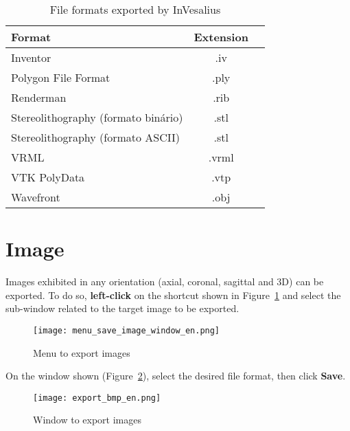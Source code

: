 \begin{table}[h]
\centering
\caption{File formats exported by InVesalius}
\begin{tabular}{lcc}\\
\hline %
Format & Extension\\
\hline
\hline
Inventor & .iv\\
Polygon File Format & .ply\\
Renderman & .rib\\
Stereolithography (formato binário)& .stl\\
Stereolithography (formato ASCII) & .stl\\
VRML & .vrml\\
VTK PolyData & .vtp\\
Wavefront & .obj\\
\hline
\end{tabular}
\label{tab:files_export_list}
\end{table} 


\section{Image}

Images exhibited in any orientation (axial, coronal, sagittal and 3D) can be exported. To do so, \textbf{left-click} on the shortcut shown in Figure~\ref{fig:menu_save_image_window} and select the sub-window related to the target image to be exported.

\begin{figure}[!htb]
\centering
\texttt{[image: menu\_save\_image\_window\_en.png]}
\caption{Menu to export images}
\label{fig:menu_save_image_window}
\end{figure}

On the window shown (Figure~\ref{fig:save_image_window}), select the desired file format, then click \textbf{Save}.

\begin{figure}[!htb]
\centering
\texttt{[image: export\_bmp\_en.png]}
\caption{Window to export images}
\label{fig:save_image_window}
\end{figure}
